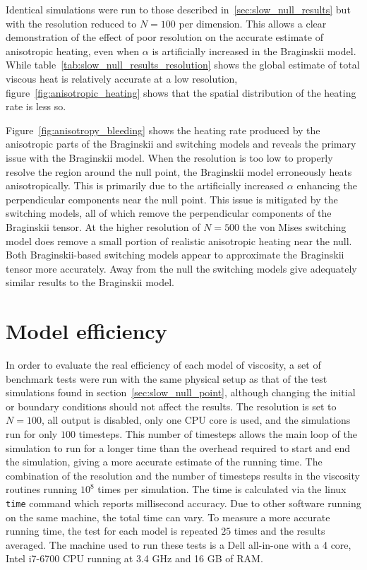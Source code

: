 

Identical simulations were run to those described in~\ref{sec:slow_null_results} but with the resolution reduced to $N=100$ per dimension. This allows a clear demonstration of the effect of poor resolution on the accurate estimate of anisotropic heating, even when $\alpha$ is artificially increased in the Braginskii model. While table~\ref{tab:slow_null_results_resolution} shows the global estimate of total viscous heat is relatively accurate at a low resolution, figure~\ref{fig:anisotropic_heating} shows that the spatial distribution of the heating rate is less so.

Figure~\ref{fig:anisotropy_bleeding} shows the heating rate produced by the anisotropic parts of the Braginskii and switching models and reveals the primary issue with the Braginskii model. When the resolution is too low to properly resolve the region around the null point, the Braginskii model erroneously heats anisotropically. This is primarily due to the artificially increased $\alpha$ enhancing the perpendicular components near the null point. This issue is mitigated by the switching models, all of which remove the perpendicular components of the Braginskii tensor. At the higher resolution of $N=500$ the von Mises switching model does remove a small portion of realistic anisotropic heating near the null. Both Braginskii-based switching models appear to approximate the Braginskii tensor more accurately. Away from the null the switching models give adequately similar results to the Braginskii model.

\section{Model efficiency}

In order to evaluate the real efficiency of each model of viscosity, a set of benchmark tests were run with the same physical setup as that of the test simulations found in section~\ref{sec:slow_null_point}, although changing the initial or boundary conditions should not affect the results. The resolution is set to $N=100$, all output is disabled, only one CPU core is used, and the simulations run for only $100$ timesteps. This number of timesteps allows the main loop of the simulation to run for a longer time than the overhead required to start and end the simulation, giving a more accurate estimate of the running time. The combination of the resolution and the number of timesteps results in the viscosity routines running $10^{8}$ times per simulation. The time is calculated via the linux \verb|time| command which reports millisecond accuracy. Due to other software running on the same machine, the total time can vary. To measure a more accurate running time, the test for each model is repeated $25$ times and the results averaged. The machine used to run these tests is a Dell all-in-one with a 4 core, Intel i7-6700 CPU running at 3.4 GHz and 16 GB of RAM. 

